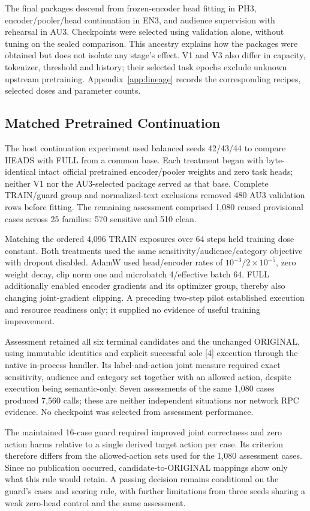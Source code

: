 \documentclass[conference]{IEEEtran}
\begin{document}
The final packages descend from frozen-encoder head fitting in PH3, encoder/pooler/head continuation in EN3, and audience supervision with rehearsal in AU3. Checkpoints were selected using validation alone, without tuning on the sealed comparison. This ancestry explains how the packages were obtained but does not isolate any stage's effect. V1 and V3 also differ in capacity, tokenizer, threshold and history; their selected task epochs exclude unknown upstream pretraining. Appendix~\ref{app:lineage} records the corresponding recipes, selected doses and parameter counts.

\subsection{Matched Pretrained Continuation}
The host continuation experiment used balanced seeds 42/43/44 to compare HEADS with FULL from a common base. Each treatment began with byte-identical intact official pretrained encoder/pooler weights and zero task heads; neither V1 nor the AU3-selected package served as that base. Complete TRAIN/guard group and normalized-text exclusions removed 480 AU3 validation rows before fitting. The remaining assessment comprised 1,080 reused provisional cases across 25 families: 570 sensitive and 510 clean.

Matching the ordered 4,096 TRAIN exposures over 64 steps held training dose constant. Both treatments used the same sensitivity/audience/category objective with dropout disabled. AdamW used head/encoder rates of $10^{-3}/2\times10^{-5}$, zero weight decay, clip norm one and microbatch 4/effective batch 64. FULL additionally enabled encoder gradients and its optimizer group, thereby also changing joint-gradient clipping. A preceding two-step pilot established execution and resource readiness only; it supplied no evidence of useful training improvement.

Assessment retained all six terminal candidates and the unchanged ORIGINAL, using immutable identities and explicit successful sole [4] execution through the native in-process handler. Its label-and-action joint measure required exact sensitivity, audience and category set together with an allowed action, despite execution being semantic-only. Seven assessments of the same 1,080 cases produced 7,560 calls; these are neither independent situations nor network RPC evidence. No checkpoint was selected from assessment performance.

The maintained 16-case guard required improved joint correctness and zero action harms relative to a single derived target action per case. Its criterion therefore differs from the allowed-action sets used for the 1,080 assessment cases. Since no publication occurred, candidate-to-ORIGINAL mappings show only what this rule would retain. A passing decision remains conditional on the guard's cases and scoring rule, with further limitations from three seeds sharing a weak zero-head control and the same assessment.
\end{document}

